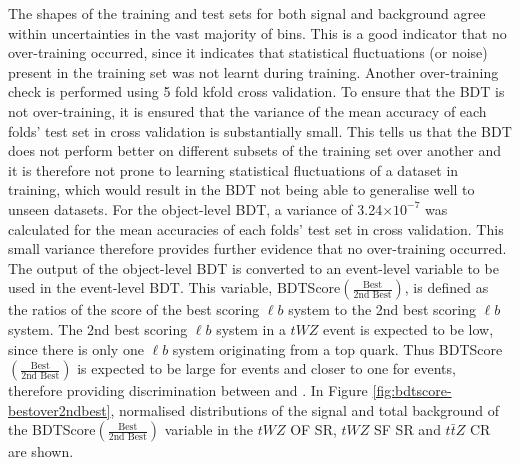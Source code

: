 \begin{figure}[h!]
\end{figure}The shapes of the training and test sets for both signal and background agree within uncertainties in the vast majority of bins. This is a good indicator that no over-training occurred, since it indicates that statistical fluctuations (or noise) present in the training set was not learnt during training. Another over-training check is performed using 5 fold kfold cross validation. To ensure that the BDT is not over-training, it is ensured that the variance of the mean accuracy of each folds' test set in cross validation is substantially small. This tells us that the BDT does not perform better on different subsets of the training set over another and it is therefore not prone to learning statistical fluctuations of a dataset in training, which would result in the BDT not being able to generalise well to unseen datasets. For the object-level BDT, a variance of 3.24$\times 10^{-7}$ was calculated for the mean accuracies of each folds' test set in cross validation. This small variance therefore provides further evidence that no over-training occurred. The output of the object-level BDT is converted to an event-level variable to be used in the event-level BDT. This variable, BDTScore$(\frac{\text{Best}}{\text{2nd Best}})$, is defined as the ratios of the score of the best scoring $\ell b$ system to the 2nd best scoring $\ell b$ system. The 2nd best scoring $\ell b$ system in a $tWZ$ event is expected to be low, since there is only one $\ell b$ system originating from a top quark. Thus BDTScore$(\frac{\text{Best}}{\text{2nd Best}})$ is expected to be large for \tWZ events and closer to one for \ttZ events, therefore providing discrimination between \tWZ and \ttZ. In Figure \ref{fig:bdtscore-bestover2ndbest}, normalised distributions of the signal and total background of the BDTScore$(\frac{\text{Best}}{\text{2nd Best}})$ variable in the $tWZ$ OF SR, $tWZ$ SF SR and $t\bar{t}Z$ CR are shown.
